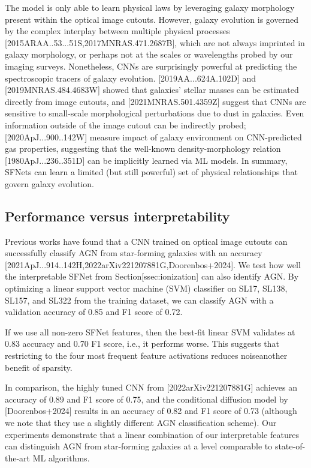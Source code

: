 \documentclass[11pt,a4paper]{article}
\begin{document}
The model is only able to learn physical laws by leveraging galaxy morphology present within the optical image cutouts. However, galaxy evolution is governed by the complex interplay between multiple physical processes [2015ARAA..53...51S,2017MNRAS.471.2687B], which are not always imprinted in galaxy morphology, or perhaps not at the scales or wavelengths probed by our imaging surveys. Nonetheless, CNNs are surprisingly powerful at predicting the spectroscopic tracers of galaxy evolution. [2019AA...624A.102D] and [2019MNRAS.484.4683W] showed that galaxies' stellar masses can be estimated directly from image cutouts, and [2021MNRAS.501.4359Z] suggest that CNNs are sensitive to small-scale morphological perturbations due to dust in galaxies. Even information outside of the image cutout can be indirectly probed; [2020ApJ...900..142W] measure impact of galaxy environment on CNN-predicted gas properties, suggesting that the well-known density-morphology relation [1980ApJ...236..351D] can be implicitly learned via ML models. In summary, SFNets can learn a limited (but still powerful) set of physical relationships that govern galaxy evolution.

\subsection{Performance versus interpretability}

Previous works have found that a CNN trained on optical image cutouts can successfully classify AGN from star-forming galaxies with an accuracy [2021ApJ...914..142H,2022arXiv221207881G,Doorenbos+2024]. We test how well the interpretable SFNet from Section[ssec:ionization] can also identify AGN. By optimizing a linear support vector machine (SVM) classifier on SL17, SL138, SL157, and SL322 from the training dataset, we can classify AGN with a validation accuracy of 0.85 and F1 score of 0.72.

If we use all non-zero SFNet features, then the best-fit linear SVM validates at 0.83 accuracy and 0.70 F1 score, i.e., it performs worse. This suggests that restricting to the four most frequent feature activations reduces noiseanother benefit of sparsity.

In comparison, the highly tuned CNN from [2022arXiv221207881G] achieves an accuracy of 0.89 and F1 score of 0.75, and the conditional diffusion model by  [Doorenbos+2024] results in an accuracy of 0.82 and F1 score of 0.73 (although we note that they use a slightly different AGN classification scheme). Our experiments demonstrate that a linear combination of our interpretable features can distinguish AGN from star-forming galaxies at a level comparable to state-of-the-art ML algorithms.
\end{document}
